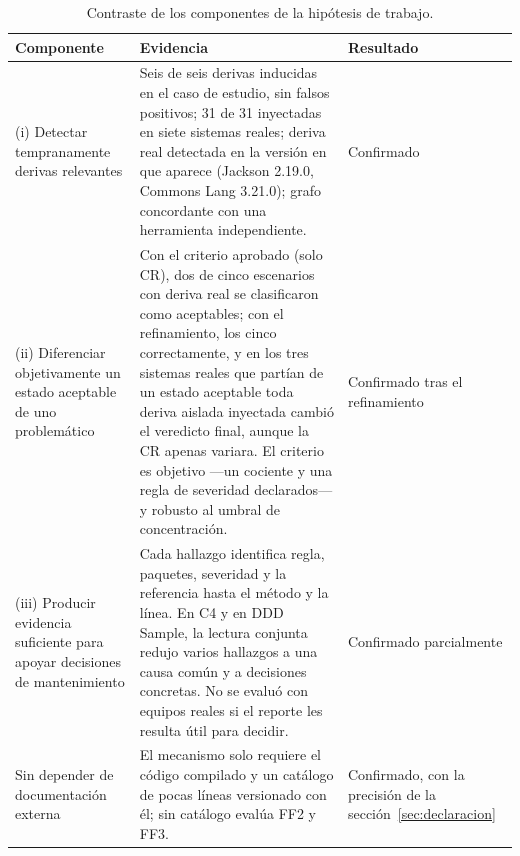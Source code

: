 \begin{table}[H]
\centering
\caption{Contraste de los componentes de la hipótesis de trabajo.}
\label{tab:hipotesis}
\footnotesize
\begin{tabularx}{\textwidth}{p{3.4cm}Xp{2.2cm}}
\toprule
\textbf{Componente} & \textbf{Evidencia} & \textbf{Resultado} \\
\midrule
(i) Detectar tempranamente derivas relevantes &
Seis de seis derivas inducidas en el caso de estudio, sin falsos positivos; 31 de 31 inyectadas en siete sistemas reales; deriva real detectada en la versión en que aparece (Jackson 2.19.0, Commons Lang 3.21.0); grafo concordante con una herramienta independiente. &
Confirmado \\
\midrule
(ii) Diferenciar objetivamente un estado aceptable de uno problemático &
Con el criterio aprobado (solo CR), dos de cinco escenarios con deriva real se clasificaron como aceptables; con el refinamiento, los cinco correctamente, y en los tres sistemas reales que partían de un estado aceptable toda deriva aislada inyectada cambió el veredicto final, aunque la CR apenas variara. El criterio es objetivo ---un cociente y una regla de severidad declarados--- y robusto al umbral de concentración. &
Confirmado tras el refinamiento \\
\midrule
(iii) Producir evidencia suficiente para apoyar decisiones de mantenimiento &
Cada hallazgo identifica regla, paquetes, severidad y la referencia hasta el método y la línea. En C4 y en DDD Sample, la lectura conjunta redujo varios hallazgos a una causa común y a decisiones concretas. No se evaluó con equipos reales si el reporte les resulta útil para decidir. &
Confirmado parcialmente \\
\midrule
Sin depender de documentación externa &
El mecanismo solo requiere el código compilado y un catálogo de pocas líneas versionado con él; sin catálogo evalúa FF2 y FF3. &
Confirmado, con la precisión de la sección~\ref{sec:declaracion} \\
\bottomrule
\end{tabularx}
\end{table}

